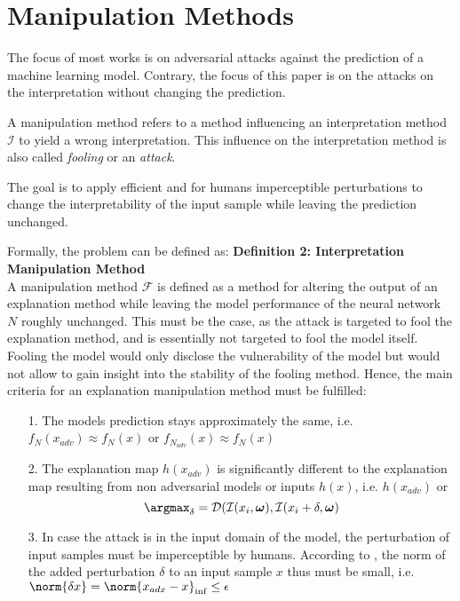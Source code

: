 \section{Manipulation Methods}
\label{sec:manipulation_methods}

The focus of most works is on adversarial attacks against the prediction of a machine learning model. Contrary, the focus of this paper is on the attacks on the interpretation without changing the prediction.

A manipulation method refers to a method influencing an interpretation method $\mathcal{I}$ to yield a wrong interpretation. This influence on the interpretation method is also called \textit{fooling} or an \textit{attack}. 

The goal is to apply efficient and for humans imperceptible perturbations to change the interpretability of the input sample while leaving the prediction unchanged. 

Formally, the problem can be defined as: 
\textbf{Definition 2: Interpretation Manipulation Method}\\
A manipulation method $\mathcal{F}$ is defined as a method for altering the output of an explanation method while leaving the model performance of the neural network $N$ roughly unchanged. 
This must be the case, as the attack is targeted to fool the explanation method, and is essentially not targeted to fool the model itself. Fooling the model would only disclose the vulnerability of the model but would not allow to gain insight into the stability of the fooling method. 
Hence, the main criteria for an explanation manipulation method must be fulfilled: 
\begin{enumerate}
    \item[1.] The models prediction stays approximately the same, i.e. $f_N(x_{adv}) \approx f_N(x)$ or $f_{N_{adv}}(x) \approx f_N(x)$
    \item[2.] The explanation map $h(x_{adv})$ is significantly different to the explanation map resulting from non adversarial models or inputs $h(x)$, i.e. $h(x_{adv})$ or $$\argmax_{\delta} = \mathcal{D}(\mathcal{I}(x_i, \boldsymbol{\omega}), \mathcal{I}(x_i+\delta, \boldsymbol{\omega})$$
    \item[3.] In case the attack is in the input domain of the model, the perturbation of input samples must be imperceptible by humans. According to \cite{dombrowski2019explanations}, the norm of the added perturbation $\delta$ to an input sample $x$ thus must be small, i.e. $\norm{\delta x} = \norm{x_{adx}-x}_{\inf} \leq \epsilon$ %
\end{enumerate}

